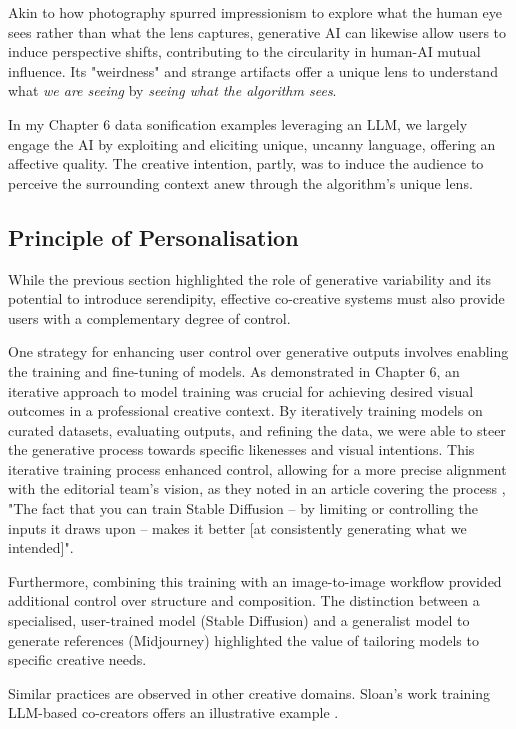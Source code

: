 Akin to how photography spurred impressionism to explore what the human eye sees rather than what the lens captures, generative AI can likewise allow users to induce perspective shifts, contributing to the circularity in human-AI mutual influence. Its "weirdness" and strange artifacts offer a unique lens to understand what \textit{we are seeing} by \textit{seeing what the algorithm sees}. 

In my Chapter 6 data sonification examples leveraging an LLM, we largely engage the AI by exploiting and eliciting unique, uncanny language, offering an affective quality. The creative intention, partly, was to induce the audience to perceive the surrounding context anew through the algorithm's unique lens.

\subsection{Principle of Personalisation}

While the previous section highlighted the role of generative variability and its potential to introduce serendipity, effective co-creative systems must also provide users with a complementary degree of control. 

One strategy for enhancing user control over generative outputs involves enabling the training and fine-tuning of models. As demonstrated in Chapter 6, an iterative approach to model training was crucial for achieving desired visual outcomes in a professional creative context. By iteratively training models on curated datasets, evaluating outputs, and refining the data, we were able to steer the generative process towards specific likenesses and visual intentions. This iterative training process enhanced control, allowing for a more precise alignment with the editorial team's vision, as they noted in an article covering the process \cite{Drummond2023-bh}, "The fact that you can train Stable Diffusion – by limiting or controlling the inputs it draws upon – makes it better [at consistently generating what we intended]".

Furthermore, combining this training with an image-to-image workflow provided additional control over structure and composition. The distinction between a specialised, user-trained model (Stable Diffusion) and a generalist model to generate references (Midjourney) highlighted the value of tailoring models to specific creative needs.

Similar practices are observed in other creative domains. Sloan's work training LLM-based co-creators offers an illustrative example \cite{Sloan2016-fj}. 

